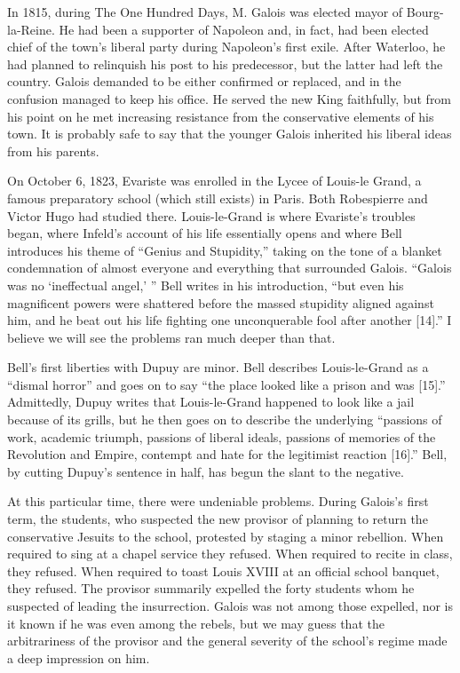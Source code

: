 \documentclass[12pt]{article}
\begin{document}
In 1815, during The One Hundred Days, M. Galois was elected mayor of Bourg-la-Reine. He had been a supporter of Napoleon and, in fact, had been elected chief of the town's liberal party during Napoleon's first exile. After Waterloo, he had planned to relinquish his post to his predecessor, but the latter had left the country. Galois demanded to be either confirmed or replaced, and in the confusion managed to keep his office. He served the new King faithfully, but from his point on he met increasing resistance from the conservative elements of his town. It is probably safe to say that the younger Galois inherited his liberal ideas from his parents.

On October 6, 1823, Evariste was enrolled in the Lycee of Louis-le Grand, a famous preparatory school (which still exists) in Paris. Both Robespierre and Victor Hugo had studied there. Louis-le-Grand is where Evariste's troubles began, where Infeld's account of his life essentially opens and where Bell introduces his theme of ``Genius and Stupidity,'' taking on the tone of a blanket condemnation of almost everyone and everything that surrounded Galois. ``Galois was no `ineffectual angel,' '' Bell writes in his introduction, ``but even his magnificent powers were shattered before the massed stupidity aligned against him, and he beat out his life fighting one unconquerable fool after another [14].'' I believe we will see the problems ran much deeper than that.

Bell's first liberties with Dupuy are minor. Bell describes Louis-le-Grand as a ``dismal horror'' and goes on to say ``the place looked like a prison and was [15].'' Admittedly, Dupuy writes that Louis-le-Grand happened to look like a jail because of its grills, but he then goes on to describe the underlying ``passions of work, academic triumph, passions of liberal ideals, passions of memories of the Revolution and Empire, contempt and hate for the legitimist reaction [16].'' Bell, by cutting Dupuy's sentence in half, has begun the slant to the negative.

At this particular time, there were undeniable problems. During Galois's first term, the students, who suspected the new provisor of planning to return the conservative Jesuits to the school, protested by staging a minor rebellion. When required to sing at a chapel service they refused. When required to recite in class, they refused. When required to toast Louis XVIII at an official school banquet, they refused. The provisor summarily expelled the forty students whom he suspected of leading the insurrection. Galois was not among those expelled, nor is it known if he was even among the rebels, but we may guess that the arbitrariness of the provisor and the general severity of the school's regime made a deep impression on him.
\end{document}
